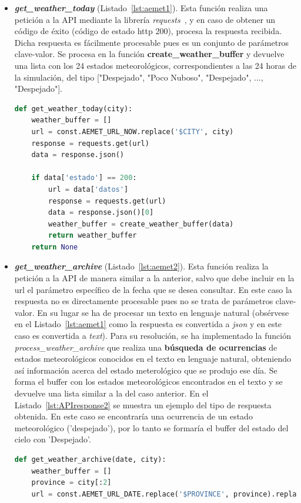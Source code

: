 \begin{itemize}
\item \textit{\textbf{get\_weather\_today}} (Listado~\ref{lst:aemet1}). Esta función realiza una petición a la \gls{API} mediante la librería \textit{requests}~\cite{Kenn11}, y en caso de obtener un código de éxito (código de estado http 200), procesa la respuesta recibida. Dicha respuesta es fácilmente procesable pues es un conjunto de parámetros clave-valor. Se procesa en la función \textbf{create\_weather\_buffer} y devuelve una lista con los 24 estados meteorológicos, correspondientes a las 24 horas de la simulación, del tipo ["Despejado", "Poco Nuboso", "Despejado", ..., "Despejado"].
\begin{lstlisting}[language=Python,float=ht,caption={Función para obtener los valores meteorológicos del día en curso},label={lst:aemet1}]
def get_weather_today(city):
    weather_buffer = []
    url = const.AEMET_URL_NOW.replace('$CITY', city)
    response = requests.get(url)
    data = response.json()

    if data['estado'] == 200:
        url = data['datos']
        response = requests.get(url)
        data = response.json()[0]
        weather_buffer = create_weather_buffer(data)
        return weather_buffer
    return None
\end{lstlisting}

\item \textit{\textbf{get\_weather\_archive}} (Listado~\ref{lst:aemet2}). Esta función realiza la petición a la \gls{API} de manera similar a la anterior, salvo que debe incluir en la url el parámetro específico de la fecha que se desea consultar. En este caso la respuesta no es directamente procesable pues no se trata de parámetros clave-valor. En su lugar se ha de procesar un texto en lenguaje natural (obsérvese en el Listado~\ref{lst:aemet1} como la respuesta es convertida a \textit{json} y en este caso es convertida a \textit{text}). Para su resolución, se ha implementado la función \textit{process\_weather\_archive} que realiza una \textbf{búsqueda de ocurrencias} de estados meteorológicos conocidos en el texto en lenguaje natural, obteniendo así información acerca del estado meterológico que se produjo ese día. Se forma el buffer con los estados meteorológicos encontrados en el texto y se devuelve una lista similar a la del caso anterior. En el Listado~\ref{lst:APIresponse2} se muestra un ejemplo del tipo de respuesta obtenida. En este caso se encontraría una ocurrencia de un estado meteorológico ('despejado'), por lo tanto se formaría el buffer del estado del cielo con 'Despejado'.
\begin{lstlisting}[language=Python,float=ht,caption={Función para obtener los valores meteorológicos de un día concreto},label={lst:aemet2}]
def get_weather_archive(date, city):
    weather_buffer = []
    province = city[:2]
    url = const.AEMET_URL_DATE.replace('$PROVINCE', province).replace('$DATE', date)


\end{lstlisting}
\end{itemize}
